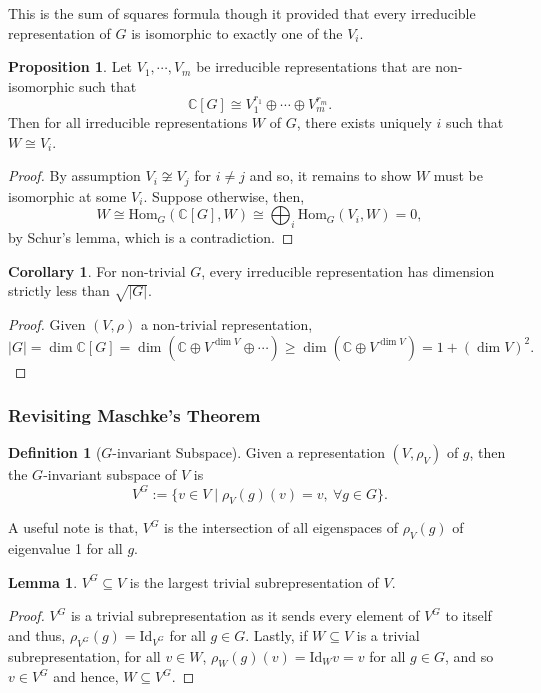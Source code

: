 \documentclass[]{article}
\theoremstyle{definition}
\newtheorem{corollary}{Corollary}[theorem]
\theoremstyle{definition}
\newtheorem{definition}{Definition}[section]
\newtheorem{lemma}{Lemma}[section]
\newtheorem{proposition}{Proposition}[section]
\begin{document}
This is the sum of squares formula though it provided that 
every irreducible representation of \(G\) is isomorphic to exactly one of the
\(V_i\).

\begin{proposition}
  Let \(V_1, \cdots, V_m\) be irreducible representations that are 
  non-isomorphic such that 
  \[\mathbb{C}[G] \cong V_1^{r_1} \oplus \cdots \oplus V_m^{r_m}.\]
  Then for all irreducible representations \(W\) of \(G\), there exists uniquely 
  \(i\) such that \(W \cong V_i\).
\end{proposition}
\begin{proof}
  By assumption \(V_i \not\cong V_j\) for \(i \neq j\) and so, it remains to 
  show \(W\) must be isomorphic at some \(V_i\). Suppose otherwise, 
  then, 
  \[W \cong \text{Hom}_G(\mathbb{C}[G], W) \cong \bigoplus_i 
    \text{Hom}_G(V_i, W) = 0,\]
  by Schur's lemma, which is a contradiction.
\end{proof}

\begin{corollary}
  For non-trivial \(G\), every irreducible representation has dimension strictly 
  less than \(\sqrt{|G|}\).
\end{corollary}
\begin{proof}
  Given \((V, \rho)\) a non-trivial representation,
  \[|G| = \dim \mathbb{C}[G] = \dim (\mathbb{C} \oplus V^{\dim V} \oplus \cdots) 
    \ge \dim (\mathbb{C} \oplus V^{\dim V}) = 1 + (\dim V)^2.\]
\end{proof}

\subsubsection{Revisiting Maschke's Theorem}

\begin{definition}[\(G\)-invariant Subspace]
  Given a representation \((V, \rho_V)\) of \(g\), then the \(G\)-invariant subspace 
  of \(V\) is 
  \[V^G := \{v \in V \mid \rho_V(g)(v) = v, \ \forall g \in G\}.\]
\end{definition}

A useful note is that, \(V^G\) is the intersection of all eigenspaces of 
\(\rho_V(g)\) of eigenvalue 1 for all \(g\).

\begin{lemma}
  \(V^G \subseteq V\) is the largest trivial subrepresentation of \(V\). 
\end{lemma}
\begin{proof}
  \(V^G\) is a trivial subrepresentation as it sends every element of \(V^G\) 
  to itself and thus, \(\rho_{V^G}(g) = \text{Id}_{V^G}\) for all \(g \in G\). 
  Lastly, if \(W \subseteq V\) is a trivial subrepresentation, for all \(v \in W\), 
  \(\rho_W(g)(v) = \text{Id}_W v = v\) for all \(g \in G\), and so 
  \(v \in V^G\) and hence, \(W \subseteq V^G\).
\end{proof}
\end{document}
